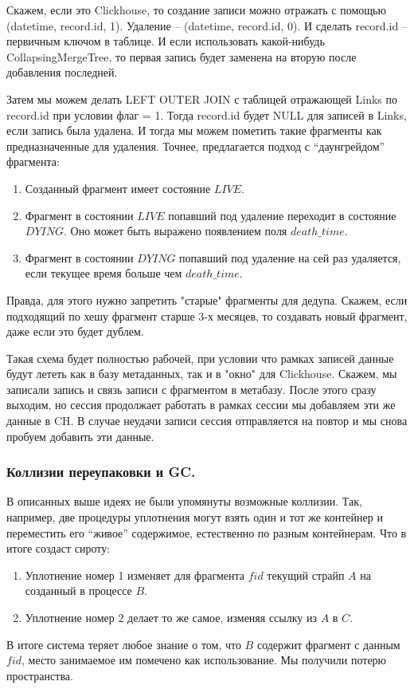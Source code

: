 \documentclass[a4paper,12pt]{article}
\begin{document}
\smallskip
Скажем, если это Clickhouse, то создание записи можно отражать с помощью (datetime, record.id, 1). Удаление – (datetime, record.id, 0). И сделать record.id – первичным ключом в таблице.
И если использовать какой-нибудь CollapsingMergeTree, то первая запись будет заменена на вторую после добавления последней.

\smallskip
Затем мы можем делать LEFT OUTER JOIN с таблицей отражающей Links по record.id при условии флаг = 1. Тогда record.id будет NULL для записей в Links, если
запись была удалена. И тогда мы можем пометить такие фрагменты как предназначенные для удаления. Точнее, предлагается подход с \enquote{даунгрейдом} фрагмента:

\begin{enumerate}
\item Созданный фрагмент имеет состояние $LIVE$.
\item Фрагмент в состоянии $LIVE$ попавший под удаление переходит в состояние $DYING$. Оно может быть выражено появлением поля $death\_time$.
\item Фрагмент в состоянии $DYING$ попавший под удаление на сей раз удаляется, если текущее время больше чем $death\_time$.
\end{enumerate}

\smallskip
Правда, для этого нужно запретить "старые" фрагменты для дедупа. Скажем, если подходящий по хешу фрагмент старше 3-х месяцев, то создавать новый фрагмент, даже если это будет дублем.

\bigskip
Такая схема будет полностью рабочей, при условии что рамках записей данные будут лететь как в базу метаданных, так и в "окно" для Clickhouse.
Скажем, мы записали запись и связь записи с фрагментом в метабазу. После этого сразу выходим, но сессия продолжает работать в рамках сессии
мы добавляем эти же данные в CH. В случае неудачи записи сессия отправляется на повтор и мы снова пробуем добавить эти данные.


\subsubsection{Коллизии переупаковки и GC.}

В описанных выше идеях не были упомянуты возможные коллизии. Так, например, две процедуры уплотнения могут взять один и тот же контейнер и переместить его \enquote{живое}
содержимое, естественно по разным контейнерам. Что в итоге создаст сироту:
\begin{enumerate}
\item Уплотнение номер 1 изменяет для фрагмента $fid$ текущий страйп $A$ на созданный в процессе $B$.
\item Уплотнение номер 2 делает то же самое, изменяя ссылку из $A$ в $C$.
\end{enumerate}
В итоге система теряет любое знание о том, что $B$ содержит фрагмент с данным $fid$, место занимаемое им
помечено как использование. Мы получили потерю пространства.
\end{document}
